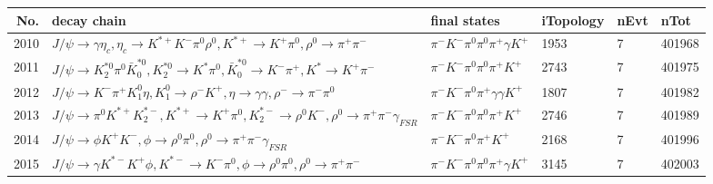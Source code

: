 \begin{table}[htbp] 
\begin{center}
\begin{small}
\begin{tabular}{rlllll}\hline\hline
 No. & decay chain & final states &  iTopology & nEvt & nTot \\\hline
2010&$J/\psi       \rightarrow \gamma       \eta_{c}    , \eta_{c}     \rightarrow K^{*+}         K^{-}          \pi^{0}        \rho^{0}      , K^{*+}          \rightarrow K^{+}          \pi^{0}        , \rho^{0}       \rightarrow \pi^{+}        \pi^{-}        $&$\pi^{-}        K^{-}          \pi^{0}        \pi^{0}        \pi^{+}        \gamma       K^{+}          $& 1953&    7&401968\\
2011&$J/\psi       \rightarrow K_2^{*0}       \pi^{0}        \bar{K}_0^{*0}, K_2^{*0}        \rightarrow K^{*}          \pi^{0}        , \bar{K}_0^{*0} \rightarrow K^{-}          \pi^{+}        , K^{*}           \rightarrow K^{+}          \pi^{-}        $&$\pi^{-}        K^{-}          \pi^{0}        \pi^{0}        \pi^{+}        K^{+}          $& 2743&    7&401975\\
2012&$J/\psi       \rightarrow K^{-}          \pi^{+}        K_1^{0}        \eta          , K_1^{0}         \rightarrow \rho^{-}      K^{+}          , \eta           \rightarrow \gamma       \gamma       , \rho^{-}       \rightarrow \pi^{-}        \pi^{0}        $&$\pi^{-}        K^{-}          \pi^{0}        \pi^{+}        \gamma       \gamma       K^{+}          $& 1807&    7&401982\\
2013&$J/\psi       \rightarrow \pi^{0}        K^{*+}         K_2^{*-}       , K^{*+}          \rightarrow K^{+}          \pi^{0}        , K_2^{*-}        \rightarrow \rho^{0}      K^{-}          , \rho^{0}       \rightarrow \pi^{+}        \pi^{-}        \gamma_{FSR} $&$\pi^{-}        K^{-}          \pi^{0}        \pi^{0}        \pi^{+}        K^{+}          $& 2746&    7&401989\\
2014&$J/\psi       \rightarrow \phi           K^{+}          K^{-}          , \phi            \rightarrow \rho^{0}      \pi^{0}        , \rho^{0}       \rightarrow \pi^{+}        \pi^{-}        \gamma_{FSR} $&$\pi^{-}        K^{-}          \pi^{0}        \pi^{+}        K^{+}          $& 2168&    7&401996\\
2015&$J/\psi       \rightarrow \gamma       K^{*-}         K^{+}          \phi           , K^{*-}          \rightarrow K^{-}          \pi^{0}        , \phi            \rightarrow \rho^{0}      \pi^{0}        , \rho^{0}       \rightarrow \pi^{+}        \pi^{-}        $&$\pi^{-}        K^{-}          \pi^{0}        \pi^{0}        \pi^{+}        \gamma       K^{+}          $& 3145&    7&402003\\

\end{tabular}
\end{small}
\end{center}
\end{table}
